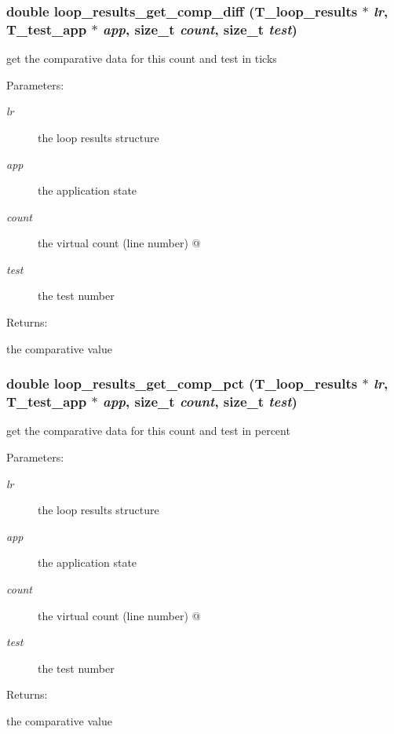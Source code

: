 \subsubsection{\setlength{\rightskip}{0pt plus 5cm}double loop\_\-results\_\-get\_\-comp\_\-diff ({\bf T\_\-loop\_\-results} $\ast$ {\em lr}, {\bf T\_\-test\_\-app} $\ast$ {\em app}, size\_\-t {\em count}, size\_\-t {\em test})}\label{group__loop__test_a10}


get the comparative data for this count and test in ticks \begin{Desc}
\item[Parameters: ]\par
\begin{description}
\item[{\em 
lr}]the loop results structure \item[{\em 
app}]the application state \item[{\em 
count}]the virtual count (line number) @ \item[{\em 
test}]the test number \end{description}
\end{Desc}
\begin{Desc}
\item[Returns: ]\par
the comparative value \end{Desc}
\subsubsection{\setlength{\rightskip}{0pt plus 5cm}double loop\_\-results\_\-get\_\-comp\_\-pct ({\bf T\_\-loop\_\-results} $\ast$ {\em lr}, {\bf T\_\-test\_\-app} $\ast$ {\em app}, size\_\-t {\em count}, size\_\-t {\em test})}\label{group__loop__test_a11}


get the comparative data for this count and test in percent \begin{Desc}
\item[Parameters: ]\par
\begin{description}
\item[{\em 
lr}]the loop results structure \item[{\em 
app}]the application state \item[{\em 
count}]the virtual count (line number) @ \item[{\em 
test}]the test number \end{description}
\end{Desc}
\begin{Desc}
\item[Returns: ]\par
the comparative value \end{Desc}
